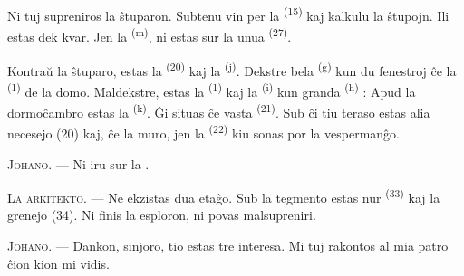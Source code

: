 Ni tuj supreniros la ŝtuparon. Subtenu vin per la 
\textsuperscript{(15)} kaj kalkulu la ŝtupojn. Ili estas dek kvar. Jen la
 \textsuperscript{(m)}, ni estas sur la unua 
\textsuperscript{(27)}.

\VUsaut{3.0mm}
\VUsaut{3.0mm}

Kontraŭ la ŝtuparo, estas la  \textsuperscript{(20)} kaj la
 \textsuperscript{(j)}. Dekstre bela 
\textsuperscript{(g)} kun du fenestroj ĉe la 
\textsuperscript{(1)} de la domo. Maldekstre, estas la 
\textsuperscript{(1)} kaj la  \textsuperscript{(i)}
kun granda  \textsuperscript{(h)} : Apud la dormoĉambro estas la
 \textsuperscript{(k)}. Ĝi situas ĉe vasta
 \textsuperscript{(21)}. Sub ĉi tiu teraso estas alia necesejo
(20) kaj, ĉe la muro, jen la  \textsuperscript{(22)} kiu
sonas por la vespermanĝo.

\textsc{Johano}. --- Ni iru sur la .

\textsc{La arkitekto}. --- Ne ekzistas dua etaĝo. Sub la tegmento estas nur
 \textsuperscript{(33)} kaj la grenejo (34). Ni finis la
esploron, ni povas malsupreniri.

\textsc{Johano}. --- Dankon, sinjoro, tio estas tre interesa. Mi tuj rakontos
al mia patro ĉion kion mi vidis.
\VUsaut{4.0mm}
\VUfilet{22mm}
